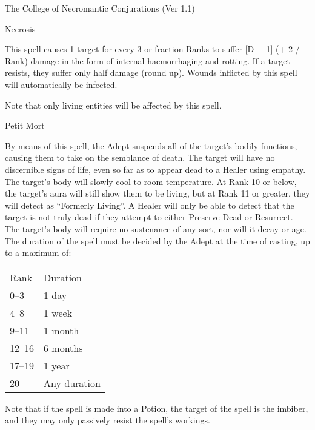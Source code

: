 \begin{Chapter}{The College of Necromantic Conjurations (Ver 1.1)}
\begin{spell}[S-9]{Necrosis}
\begin{effects}
This spell causes 1 target for every 3 or fraction Ranks to suffer [D
  + 1] (+ 2 / Rank) damage in the form of internal haemorrhaging and
rotting.  If a target resists, they suffer only half damage (round
up). Wounds inflicted by this spell will automatically be infected.

Note that only living entities will be affected by this spell.
\end{effects}
\end{spell}

\begin{spell}[S-10]{Petit Mort}

\begin{effects}
By means of this spell, the Adept suspends all of the target’s bodily
functions, causing them to take on the semblance of death.  The target
will have no discernible signs of life, even so far as to appear dead
to a Healer using empathy.  The target’s body will slowly cool to room
temperature.  At Rank 10 or below, the target’s aura will still show
them to be living, but at Rank 11 or greater, they will detect as
“Formerly Living”.  A Healer will only be able to detect that the
target is not truly dead if they attempt to either Preserve Dead or
Resurrect.  The target’s body will require no sustenance of any sort,
nor will it decay or age. The duration of the spell must be decided by
the Adept at the time of casting, up to a maximum of:

\begin{tabularx}{\columnwidth}{lX}
Rank	& Duration \\
0--3	& 1 day \\
4--8	& 1 week \\
9--11	& 1 month \\
12--16	& 6 months \\
17--19	& 1 year \\
20	& Any duration \\
\end{tabularx}

Note that if the spell is made into a Potion, the target of the spell
is the imbiber, and they may only passively resist the spell’s
workings.
\end{effects}
\end{spell}


\end{Chapter}
